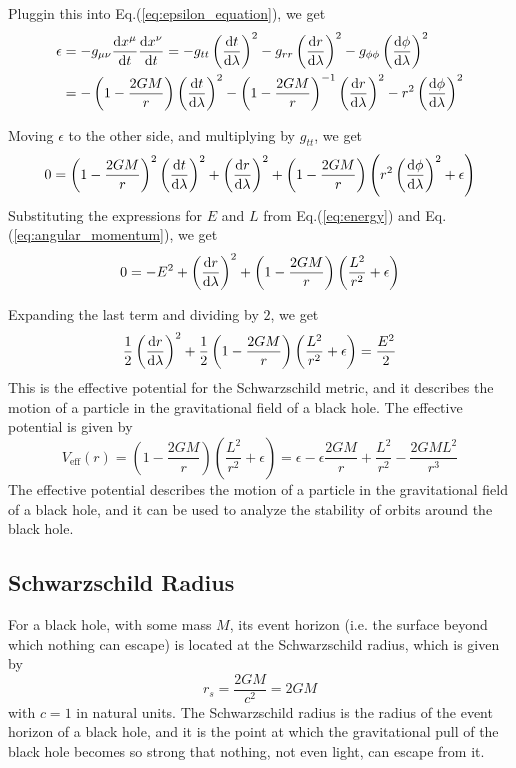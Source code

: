 \documentclass[12pt]{article}
\begin{document}
Pluggin this into Eq.(\ref{eq:epsilon_equation}), we get
\begin{align*}
	\epsilon &= -g_{\mu\nu}\dv{x^{\mu}}{t}\dv{x^{\nu}}{t} = -g_{tt} \left(\dv{t}{\lambda}\right)^2 - g_{rr} \left(\dv{r}{\lambda}\right)^2 - g_{\phi\phi} \left(\dv{\phi}{\lambda}\right)^2 \\
	&= -\left(1 - \frac{2GM}{r}\right) \left(\dv{t}{\lambda}\right)^2 - \left(1 - \frac{2GM}{r}\right)^{-1} \left(\dv{r}{\lambda}\right)^2 - r^2 \left(\dv{\phi}{\lambda}\right)^2
\end{align*}

Moving $\epsilon$ to the other side, and multiplying by $g_{tt}$, we get
\[
	0 = \left(1 - \frac{2GM}{r}\right)^{2} \left(\dv{t}{\lambda}\right)^2 + \left(\dv{r}{\lambda}\right)^2 + \left(1 - \frac{2GM}{r}\right) \left(r^2 \left(\dv{\phi}{\lambda}\right)^2 + \epsilon \right)
\]
Substituting the expressions for \(E\) and \(L\) from Eq.(\ref{eq:energy}) and Eq.(\ref{eq:angular_momentum}), we get
\begin{equation}
	0 = -E^{2} + \left(\dv{r}{\lambda}\right)^2 + \left(1 - \frac{2GM}{r}\right) \left(\frac{L^{2}}{r^{2}} + \epsilon \right)
\end{equation}

Expanding the last term and dividing by $2$, we get
\[
	\frac{1}{2} \left(\dv{r}{\lambda}\right)^2 + \frac{1}{2} \left(1 - \frac{2GM}{r}\right) \left(\frac{L^{2}}{r^{2}} + \epsilon \right) = \frac{E^{2}}{2}
\]
This is the effective potential for the Schwarzschild metric, and it describes the motion of a particle in the gravitational field of a black hole.
The effective potential is given by
\begin{equation}
	V_{\text{eff}}(r) = \left(1 - \frac{2GM}{r}\right) \left(\frac{L^{2}}{r^{2}} + \epsilon \right) = \epsilon - \epsilon\frac{2GM}{r} + \frac{L^{2}}{r^{2}} - \frac{2GM L^{2}}{r^{3}}
\end{equation}
The effective potential describes the motion of a particle in the gravitational field of a black hole, and it can be used to analyze the stability of orbits around the black hole.

\subsection{Schwarzschild Radius}
For a black hole, with some mass \(M\), its event horizon (i.e. the surface beyond which nothing can escape) is located at the Schwarzschild radius, which is given by
\[
	r_{s} = \frac{2GM}{c^{2}} = 2GM
\]
with \(c = 1\) in natural units.
The Schwarzschild radius is the radius of the event horizon of a black hole, and it is the point at which the gravitational pull of the black hole becomes so strong that nothing, not even light, can escape from it.
\end{document}
